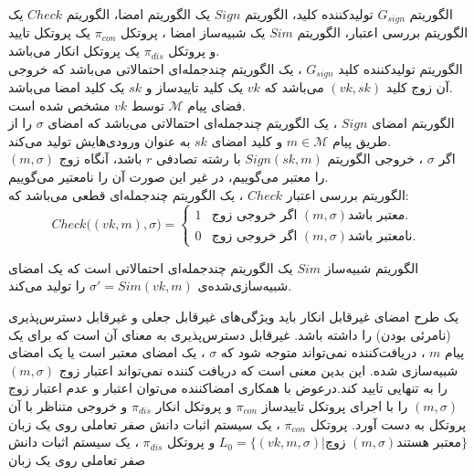 \documentclass[12pt,a4paper]{article}
\begin{document}
الگوریتم
$G_{sign}$
تولیدکننده کلید، الگوریتم
$Sign$
یک الگوریتم امضا، الگوریتم 
$Check$
یک الگوریتم بررسی اعتبار، الگوریتم
$Sim$
یک شبیه‌ساز امضا ، پروتکل 
$\pi_{con}$
یک پروتکل تایید و پروتکل 
$\pi_{dis}$
یک پروتکل انکار می‌باشد.
\\
الگوریتم تولیدکننده کلید 
$G_{sign}$
، یک الگوریتم چندجمله‌ای احتمالاتی 
می‌باشد که خروجی آن زوج کلید
$(vk,sk)$
می‌باشد که 
$vk$
یک کلید تاییدساز و 
$sk$
یک کلید امضا 
می‌باشد.
\\
 فضای پیام 
$\mathcal{M}$
توسط 
$vk$
مشخص شده است.
\\
 الگوریتم امضای
$Sign$
، یک الگوریتم چندجمله‌ای احتمالاتی می‌باشد که امضای 
$\sigma$
را از طریق پیام 
$m \in \mathcal{M}$
 و کلید امضای 
$sk$
 به عنوان ورودی‌هایش تولید می‌کند.
 \\
  اگر 
$\sigma$
 ، خروجی الگوریتم
$Sign(sk,m)$
با رشته تصادفی 
$r$
باشد، آنگاه زوج 
$(m,\sigma)$
را معتبر می‌گوییم، در غیر این صورت آن را نامعتیر می‌گوییم.
\\
الگوریتم بررسی اعتبار
$Check$
، یک الگوریتم چندجمله‌ای قطعی می‌باشد که:
$$ Check \big( (vk,m),\sigma \big) = 
	\begin{cases}
		1 & \text{
			اگر خروجی زوج 
			$(m,\sigma)$
			معتبر باشد.
				} \\
			0 & \text{
				اگر خروجی زوج 
				$(m,\sigma)$
				نامعتبر باشد.
			}
	\end{cases}
$$

الگوریتم شبیه‌ساز
$Sim$
یک الگوریتم چندجمله‌ای احتمالاتی است که یک امضای شبیه‌سازی‌شده‌ی
${\sigma}' = Sim(vk,m)$
را تولید می‌کند.

یک طرح امضای غیرقابل انکار باید ویژگی‌های غیرقابل جعلی
و غیرقابل دسترس‌پذیری (نامرئی بودن)
را داشته باشد. غیرقابل دسترس‌پذیری به معنای آن است که برای یک پیام 
$m$
، دریافت‌کننده نمی‌تواند متوجه شود که 
$\sigma$
، یک امضای معتبر است یا یک امضای شبیه‌سازی شده. این بدین معنی است که دریافت کننده نمی‌تواند اعتبار زوج 
$(m,\sigma)$
را به تنهایی تایید کند.درعوض با همکاری امضاکننده می‌توان اعتبار و عدم اعتبار زوج 
$(m,\sigma)$
را با اجرای پروتکل تاییدساز
$\pi_{con}$
و پروتکل انکار
$\pi_{dis}$
و خروجی متناظر با آن پروتکل به دست آورد. پروتکل
$\pi_{con}$ 
، یک سیستم اثبات دانش صفر تعاملی
روی یک زبان 
$L_0 = \{ (vk,m,\sigma) | 
\text{زوچ 
$(m,\sigma)$
معتبر هستند
}
\}$
 و پروتکل 
$\pi_{dis}$
، یک سیستم اثبات دانش صفر تعاملی روی یک زبان 
\end{document}
